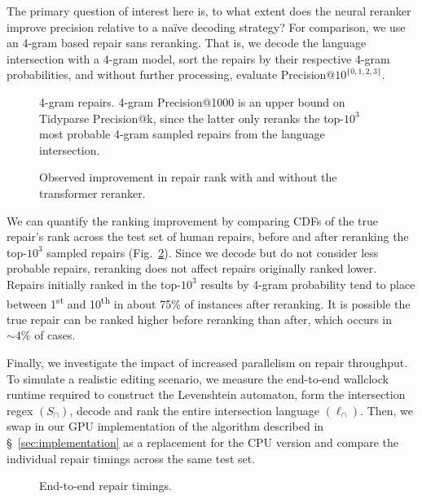\documentclass[sigplan,acmsmall,nonacm,screen]{acmart}\settopmatter{printfolios=false,printccs=false,printacmref=false}
\begin{document}
The primary question of interest here is, to what extent does the neural reranker improve precision relative to a na\"ive decoding strategy? For comparison, we use an 4-gram based repair sans reranking. That is, we decode the language intersection with a 4-gram model, sort the repairs by their respective 4-gram probabilities, and without further processing, evaluate Precision@$10^{\{0, 1, 2, 3\}}$.\vspace{-0.2cm}
\begin{figure}[H]
\resizebox{.24\textwidth}{!}{}
\resizebox{.24\textwidth}{!}{}
\resizebox{.24\textwidth}{!}{}
\resizebox{.24\textwidth}{!}{}
\caption{4-gram repairs. 4-gram Precision@1000 is an upper bound on Tidyparse Precision@k, since the latter only reranks the top-$10^3$ most probable 4-gram sampled repairs from the language intersection.}\label{fig:adaptive}
\end{figure}\vspace{-0.2cm}

\begin{figure}
\vspace{-0.35cm}
%
%
\resizebox{.45\textwidth}{!}{}
\vspace{-0.8cm}
\caption{Observed improvement in repair rank with and without the transformer reranker.}
\label{fig:rank_cdf}
\vspace{-0.3cm}
\end{figure}

We can quantify the ranking improvement by comparing CDFs of the true repair's rank across the test set of human repairs, before and after reranking the top-$10^3$ sampled repairs (Fig.~\ref{fig:rank_cdf}). Since we decode but do not consider less probable repairs, reranking does not affect repairs originally ranked lower. Repairs initially ranked in the top-$10^3$ results by 4-gram probability tend to place between 1\textsuperscript{st} and 10\textsuperscript{th} in about 75\% of instances after reranking. It is possible the true repair can be ranked higher before reranking than after, which occurs in $\sim4\%$ of cases.

Finally, we investigate the impact of increased parallelism on repair throughput. To simulate a realistic editing scenario, we measure the end-to-end wallclock runtime required to construct the Levenshtein automaton, form the intersection regex $(S_\cap)$, decode and rank the entire intersection language $(\ell_\cap)$. Then, we swap in our GPU implementation of the algorithm described in \S~\ref{sec:implementation} as a replacement for the CPU version and compare the individual repair timings across the same test set.
\begin{figure}
\vspace{-0.2cm}
\resizebox{.38\textwidth}{!}{}
\vspace{-0.7cm}
\caption{End-to-end repair timings.}
\label{fig:timings}
\vspace{-0.3cm}
\end{figure}
\end{document}
